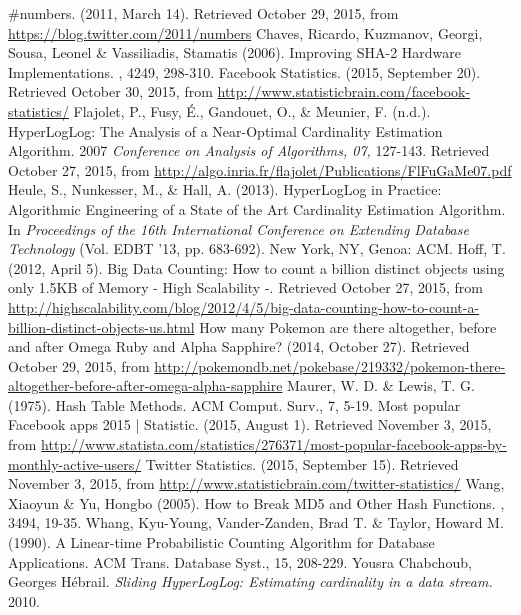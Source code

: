 \documentclass{article}
\begin{document}
\newpage
\begin{thebibliography}{9}
 \#numbers. (2011, March 14). Retrieved October 29, 2015, from \url{https://blog.twitter.com/2011/numbers}
 Chaves, Ricardo, Kuzmanov, Georgi, Sousa, Leonel \& Vassiliadis, Stamatis (2006). Improving SHA-2 Hardware Implementations. , 4249, 298-310.
 Facebook Statistics. (2015, September 20). Retrieved October 30, 2015, from \url{http://www.statisticbrain.com/facebook-statistics/}
 Flajolet, P., Fusy, \'E., Gandouet, O., \& Meunier, F. (n.d.). HyperLogLog: The Analysis of a Near-Optimal Cardinality Estimation Algorithm. 2007 \textit{Conference on Analysis of Algorithms, 07,} 127-143. Retrieved October 27, 2015, from \url{http://algo.inria.fr/flajolet/Publications/FlFuGaMe07.pdf}
 Heule, S., Nunkesser, M., \& Hall, A. (2013). HyperLogLog in Practice: Algorithmic Engineering of a State of the Art Cardinality Estimation Algorithm. In \textit{Proceedings of the 16th International Conference on Extending Database Technology} (Vol. EDBT '13, pp. 683-692). New York, NY, Genoa: ACM.
 Hoff, T. (2012, April 5). Big Data Counting: How to count a billion distinct objects using only 1.5KB of Memory - High Scalability -. Retrieved October 27, 2015, from \url{http://highscalability.com/blog/2012/4/5/big-data-counting-how-to-count-a-billion-distinct-objects-us.html}
 How many Pokemon are there altogether, before and after Omega Ruby and Alpha Sapphire? (2014, October 27). Retrieved October 29, 2015, from \url{http://pokemondb.net/pokebase/219332/pokemon-there-altogether-before-after-omega-alpha-sapphire}
 Maurer, W. D. \& Lewis, T. G. (1975). Hash Table Methods. ACM Comput. Surv., 7, 5-19.
 Most popular Facebook apps 2015 | Statistic. (2015, August 1). Retrieved November 3, 2015, from \url{http://www.statista.com/statistics/276371/most-popular-facebook-apps-by-monthly-active-users/}
 Twitter Statistics. (2015, September 15). Retrieved November 3, 2015, from \url{http://www.statisticbrain.com/twitter-statistics/}
 Wang, Xiaoyun \& Yu, Hongbo (2005). How to Break MD5 and Other Hash Functions. , 3494, 19-35.
 Whang, Kyu-Young, Vander-Zanden, Brad T. \& Taylor, Howard M. (1990). A Linear-time Probabilistic Counting Algorithm for Database Applications. ACM Trans. Database Syst., 15, 208-229.
Yousra Chabchoub, Georges H\'ebrail. \textit{Sliding HyperLogLog: Estimating cardinality in a data stream.} 2010. 
\end{thebibliography}
\end{document}
